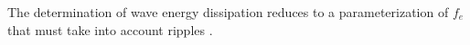 The determination of wave energy dissipation reduces to a parameterization of $f_{e}$ that must take into 
account ripples \citep{Graber&Madsen1988,Tolman1994,Ardhuin&al.2003a}.



